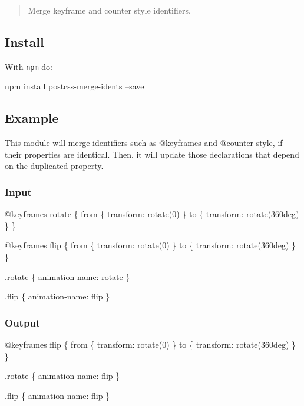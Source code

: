\begin{quote}
Merge keyframe and counter style identifiers. \end{quote}


\subsection*{Install}

With \href{https://npmjs.org/package/postcss-merge-idents}{\tt npm} do\+:


\begin{DoxyCode}
npm install postcss-merge-idents --save
\end{DoxyCode}


\subsection*{Example}

This module will merge identifiers such as {\ttfamily @keyframes} and {\ttfamily @counter-\/style}, if their properties are identical. Then, it will update those declarations that depend on the duplicated property.

\subsubsection*{Input}


\begin{DoxyCode}
@keyframes rotate \{
    from \{ transform: rotate(0) \}
    to \{ transform: rotate(360deg) \}
\}

@keyframes flip \{
    from \{ transform: rotate(0) \}
    to \{ transform: rotate(360deg) \}
\}

.rotate \{
    animation-name: rotate
\}

.flip \{
    animation-name: flip
\}
\end{DoxyCode}


\subsubsection*{Output}


\begin{DoxyCode}
@keyframes flip \{
    from \{ transform: rotate(0) \}
    to \{ transform: rotate(360deg) \}
\}

.rotate \{
    animation-name: flip
\}

.flip \{
    animation-name: flip
\}
\end{DoxyCode}


